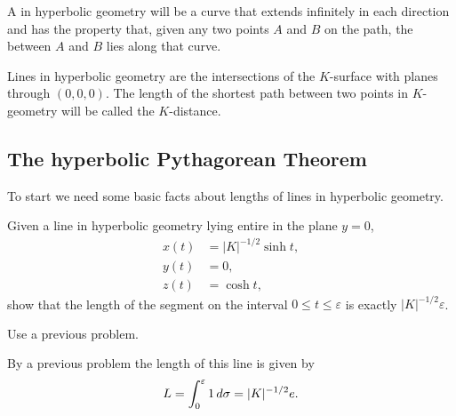 \documentclass[handout,newpage,hints,,12pt,noauthor,nooutcomes]{ximera}
\begin{document}
\begin{definition}
A  in hyperbolic geometry will be a curve that extends
infinitely in each direction and has the property that, given any two
points $A$ and $B$ on the path, the  between $A$
and $B$ lies along that curve.



Lines in hyperbolic geometry are the intersections of the $K$-surface
with planes through $(0,0,0)$. The length of the shortest path between
two points in $K$-geometry will be called the $K$-distance.
\end{definition}


\subsection{The hyperbolic Pythagorean Theorem}

To start we need some basic facts about lengths of lines in hyperbolic
geometry.

\begin{problem}
  Given a line in hyperbolic geometry lying entire in the plane
  $y=0$,
  \begin{align*}
    x(t) &= |K|^{-1/2}\sinh t,\\
    y(t) &= 0,\\
    z(t) &= \cosh t,
  \end{align*}
  show that the length of the segment on the interval $0 \leq t \leq
  \varepsilon$ is exactly $|K|^{-1/2}\varepsilon$.
  \begin{hint}
    Use a previous problem.
  \end{hint}
  \begin{freeResponse}
    By a previous problem the length of this line is given by
    \[
    L=\int_{0}^{\varepsilon} 1 \,d\sigma = |K|^{-1/2}e.
    \]
  \end{freeResponse}
\end{problem}
\end{document}
